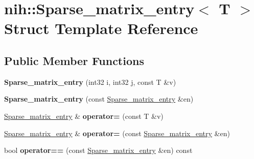 \hypertarget{structnih_1_1_sparse__matrix__entry}{
\section{nih\-:\-:\-Sparse\-\_\-matrix\-\_\-entry$<$ \-T $>$ \-Struct \-Template \-Reference}
\label{structnih_1_1_sparse__matrix__entry}
}
\subsection*{\-Public \-Member \-Functions}
\begin{DoxyCompactItemize}
\item 
\hypertarget{structnih_1_1_sparse__matrix__entry_a7e73d0e7c540029fc852f7fdceb85616}{
{\bfseries \-Sparse\-\_\-matrix\-\_\-entry} (int32 i, int32 j, const \-T \&v)}
\label{structnih_1_1_sparse__matrix__entry_a7e73d0e7c540029fc852f7fdceb85616}

\item 
\hypertarget{structnih_1_1_sparse__matrix__entry_a6926f82f1fa9ad4d7f7acad40a0854ba}{
{\bfseries \-Sparse\-\_\-matrix\-\_\-entry} (const \hyperlink{structnih_1_1_sparse__matrix__entry}{\-Sparse\-\_\-matrix\-\_\-entry} \&en)}
\label{structnih_1_1_sparse__matrix__entry_a6926f82f1fa9ad4d7f7acad40a0854ba}

\item 
\hypertarget{structnih_1_1_sparse__matrix__entry_ab841b368366dac44d2d75443c9664e10}{
\hyperlink{structnih_1_1_sparse__matrix__entry}{\-Sparse\-\_\-matrix\-\_\-entry} \& {\bfseries operator=} (const \-T \&v)}
\label{structnih_1_1_sparse__matrix__entry_ab841b368366dac44d2d75443c9664e10}

\item 
\hypertarget{structnih_1_1_sparse__matrix__entry_a88cea43e02f356d335c69a36a24b9a58}{
\hyperlink{structnih_1_1_sparse__matrix__entry}{\-Sparse\-\_\-matrix\-\_\-entry} \& {\bfseries operator=} (const \hyperlink{structnih_1_1_sparse__matrix__entry}{\-Sparse\-\_\-matrix\-\_\-entry} \&en)}
\label{structnih_1_1_sparse__matrix__entry_a88cea43e02f356d335c69a36a24b9a58}

\item 
\hypertarget{structnih_1_1_sparse__matrix__entry_a409be22bb6b94108ddbe0018231ba505}{
bool {\bfseries operator==} (const \hyperlink{structnih_1_1_sparse__matrix__entry}{\-Sparse\-\_\-matrix\-\_\-entry} \&en) const }
\label{structnih_1_1_sparse__matrix__entry_a409be22bb6b94108ddbe0018231ba505}


\end{DoxyCompactItemize}
